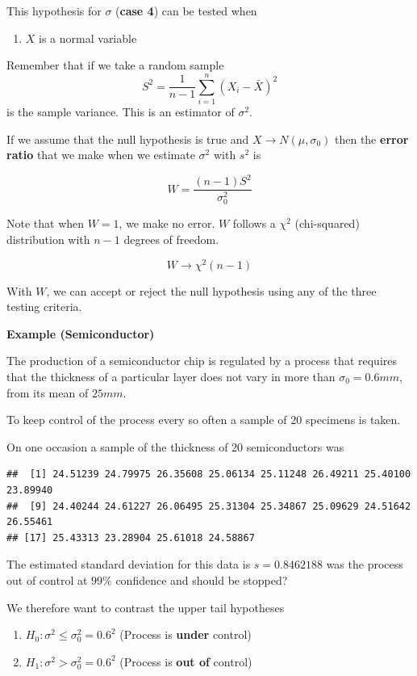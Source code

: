 \documentclass[
]{book}
\providecommand{\tightlist}{%
  \setlength{\itemsep}{0pt}\setlength{\parskip}{0pt}}
\begin{document}
This hypothesis for \(\sigma\) (\textbf{case 4}) can be tested when

\begin{enumerate}
\def\labelenumi{\arabic{enumi}.}
\tightlist
\item
  \(X\) is a normal variable
\end{enumerate}

Remember that if we take a random sample \[S^2=\frac{1}{n-1}\sum_{i=1}^n (X_i-\bar{X})^2\] is the sample variance. This is an estimator of \(\sigma^2\).

If we assume that the null hypothesis is true and \(X \rightarrow N(\mu, \sigma_0)\) then the \textbf{error ratio} that we make when we estimate \(\sigma^2\) with \(s^2\) is

\[W=\frac{(n-1)S^2}{\sigma_0^2}\]

Note that when \(W=1\), we make no error. \(W\) follows a \(\chi^2\) (chi-squared) distribution with \(n-1\) degrees of freedom.

\[W \rightarrow \chi^2(n-1)\]

With \(W\), we can accept or reject the null hypothesis using any of the three testing criteria.

\textbf{Example (Semiconductor)}

The production of a semiconductor chip is regulated by a process that requires that the thickness of a particular layer does not vary in more than \(\sigma_0=0.6mm\), from its mean of \(25mm\).

To keep control of the process every so often a sample of \(20\) specimens is taken.

On one occasion a sample of the thickness of 20 semiconductors was

\begin{verbatim}
##  [1] 24.51239 24.79975 26.35608 25.06134 25.11248 26.49211 25.40100 23.89940
##  [9] 24.40244 24.61227 26.06495 25.31304 25.34867 25.09629 24.51642 26.55461
## [17] 25.43313 23.28904 25.61018 24.58867
\end{verbatim}

The estimated standard deviation for this data is \(s=0.8462188\) was the process out of control at \(99\%\) confidence and should be stopped?

We therefore want to contrast the upper tail hypotheses

\begin{enumerate}
\def\labelenumi{\alph{enumi}.}
\tightlist
\item
  \(H_0:\sigma^2 \leq \sigma_0^2=0.6^2\) (Process is \textbf{under} control)
\item
  \(H_1:\sigma^2 > \sigma_0^2=0.6^2\) (Process is \textbf{out of} control)
\end{enumerate}
\end{document}

